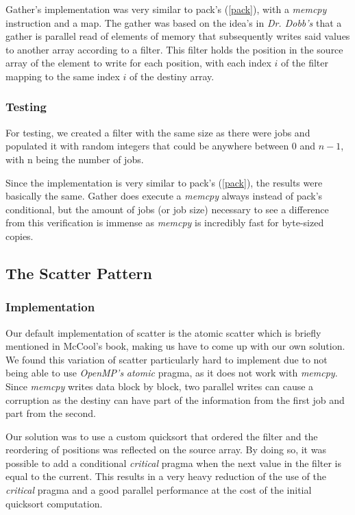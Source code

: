 \documentclass[10pt,journal]{IEEEtran}
\begin{document}
Gather's implementation was very similar to pack's (\ref{pack}), with a \textit{memcpy} instruction and a map. The gather was based on the idea's in \textit{Dr. Dobb's} that a gather is parallel read of elements of memory that subsequently writes said values to another array according to a filter. This filter holds the position in the source array of the element to write for each position, with each index $ i $ of the filter mapping to the same index $ i $ of the destiny array.

\subsubsection{Testing}

For testing, we created a filter with the same size as there were jobs and populated it with random integers that could be anywhere between 0 and $ n - 1 $, with n being the number of jobs.

Since the implementation is very similar to pack's (\ref{pack}), the results were basically the same. Gather does execute a \textit{memcpy} always instead of pack's conditional, but the amount of jobs (or job size) necessary to see a difference from this verification is immense as \textit{memcpy} is incredibly fast for byte-sized copies.

\subsection{The Scatter Pattern}
\label{scatter}

\subsubsection{Implementation}

Our default implementation of scatter is the atomic scatter which is briefly mentioned in McCool's book, making us have to come up with our own solution. We found this variation of scatter particularly hard to implement due to not being able to use \textit{OpenMP's} \textit{atomic} pragma, as it does not work with \textit{memcpy}. Since \textit{memcpy} writes data block by block, two parallel writes can cause a corruption as the destiny can have part of the information from the first job and part from the second.

Our solution was to use a custom quicksort that ordered the filter and the reordering of positions was reflected on the source array. By doing so, it was possible to add a conditional \textit{critical} pragma when the next value in the filter is equal to the current. This results in a very heavy reduction of the use of the \textit{critical} pragma and a good parallel performance at the cost of the initial quicksort computation.
\end{document}
